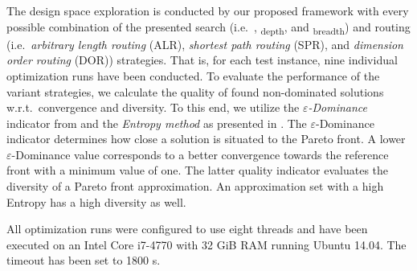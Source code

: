 The design space exploration is conducted by our proposed framework with every possible combination of the presented search (i.e.~\hybrid, \theory\textsubscript{depth}, and \theory\textsubscript{breadth})  and routing (i.e.~\emph{arbitrary length routing} (ALR), \emph{shortest path routing} (SPR), and \emph{dimension order routing} (DOR)) strategies. That is, for each test instance, nine individual optimization runs have been conducted. To evaluate the performance of the variant strategies, we calculate the quality of found non-dominated solutions w.r.t.~convergence and diversity. To this end, we utilize the \mbox{\emph{$\varepsilon$-Dominance}} indicator from \cite{Zitzler2003} and the \emph{Entropy method} as presented in \cite{Farhang-Mehr2003}. The $\varepsilon$-Dominance indicator determines how close a solution is situated to the Pareto front. A lower \mbox{$\varepsilon$-Dominance} value corresponds to a better convergence towards the reference front with a minimum value of one. %
The latter quality indicator evaluates the diversity of a Pareto front approximation. An approximation set with a high Entropy has a high diversity as well. \par
All optimization runs were configured to use eight threads and have been executed on an Intel Core i7-4770 with 32 GiB RAM running Ubuntu 14.04. The timeout has been set to 1800 s.
